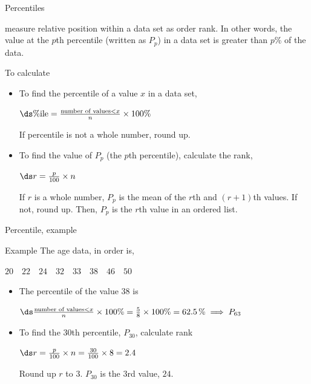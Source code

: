 \documentclass[xcolor=table, handout]{beamer}
\begin{document}
\begin{frame}{Percentiles}
\begin{block}{}
\large
{} measure relative position within a data set as order rank. In other words, the value at the $p$th percentile (written as $P_p$) in a data set is greater than $p$\% of the data.
\end{block}

\pause
\begin{block}{To calculate}
\begin{itemize}
\item To find the percentile of a value $x$ in a data set,\\
\smallskip
{\centering
$\ds \%\text{ile} = \frac{\text{number of values} < x}{n} \times 100\%$
\par}
\medskip
If percentile is not a whole number, round up.
\medskip
\pause\item To find the value of $P_p$ (the $p$th percentile), calculate the rank,\\
\smallskip
{\centering
$\ds r = \frac p {100} \times n$
\par}
\medskip
If $r$ is a whole number, $P_p$ is the mean of the $r$th and $(r+1)$th values. If not, round up. Then, $P_p$ is the $r$th value in an ordered list.
\end{itemize}
\end{block}
\end{frame}

\begin{frame}{Percentile, example}
\begin{exampleblock}{Example}
The age data, in order is, \\
\smallskip
{\centering
$20 \quad 22 \quad 24 \quad 32 \quad 33 \quad 38 \quad 46 \quad 50$
\par}

\begin{itemize}
\pause
\item The percentile of the value 38 is\\
\medskip
{\centering
$\ds \frac{\text{number of values} < x}{n} \times 100\% = \frac{5}{8} \times 100\% = 62.5 \,\% \implies P_{63}$
\par} 
\medskip
\pause\item To find the 30th percentile, $P_{30}$, calculate rank\\
\medskip
{\centering
$\ds r= \frac {p}{100} \times n = \frac {30}{100} \times 8 = 2.4 $
\par}
\medskip
Round up $r$ to $3$. $P_{30}$ is the 3rd value, $24$.
\end{itemize}
\end{exampleblock}
\end{frame}
\end{document}
